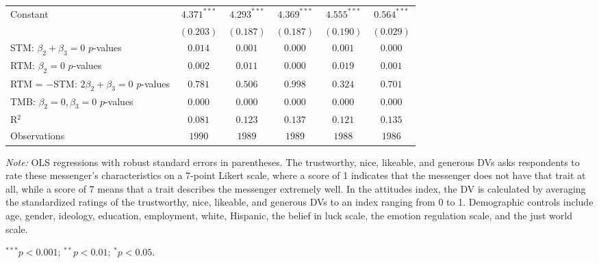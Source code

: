 \begin{table}[!t]
\begin{center}
{\begin{threeparttable}
\begin{tabular}{l c c c c c}
Constant                                        & $4.371^{***}$  & $4.293^{***}$  & $4.369^{***}$  & $4.555^{***}$  & $0.564^{***}$  \\
                                                & $(0.203)$      & $(0.187)$      & $(0.187)$      & $(0.190)$      & $(0.029)$      \\
\midrule
STM: $\beta_2 + \beta_3 = 0$ $p$-values         & $0.014$        & $0.001$        & $0.000$        & $0.001$        & $0.000$        \\
RTM: $\beta_2 = 0$ $p$-values                   & $0.002$        & $0.011$        & $0.000$        & $0.019$        & $0.001$        \\
RTM = $-$STM: $2\beta_2+\beta_3 = 0$ $p$-values & $0.781$        & $0.506$        & $0.998$        & $0.324$        & $0.701$        \\
TMB: $\beta_2 = 0, \beta_3 = 0$ $p$-values      & $0.000$        & $0.000$        & $0.000$        & $0.000$        & $0.000$        \\
R$^2$                                           & $0.081$        & $0.123$        & $0.137$        & $0.121$        & $0.135$        \\
Observations                                    & $1990$         & $1989$         & $1989$         & $1988$         & $1986$         \\
\bottomrule
\end{tabular}
\begin{tablenotes}[flushleft]
\scriptsize{\item[\hspace{-5mm}] \textit{Note:} OLS regressions with robust standard errors in parentheses. 
The trustworthy, nice, likeable, and generous DVs asks respondents to rate these messenger's characteristics on a 7-point Likert scale, where a score of 1 indicates that the messenger does not have that trait at all, while a score of 7 means that a trait describes the messenger extremely well.
    In the attitudes index, the DV is calculated by averaging the standardized ratings of the trustworthy, nice, likeable, and generous DVs to an index ranging from 0 to 1.
                                Demographic controls include age, gender, ideology,
                                education, employment, white, Hispanic, the belief in luck scale, the emotion regulation scale, and the just world scale. \item[\hspace{-5mm}] $^{***}p<0.001$; $^{**}p<0.01$; $^{*}p<0.05$.}
\end{tablenotes}
\end{threeparttable}
}
\label{tab:attitude_regression_demographic}
\end{center}
\end{table}

\renewcommand{\baselinestretch}{1.67}%
